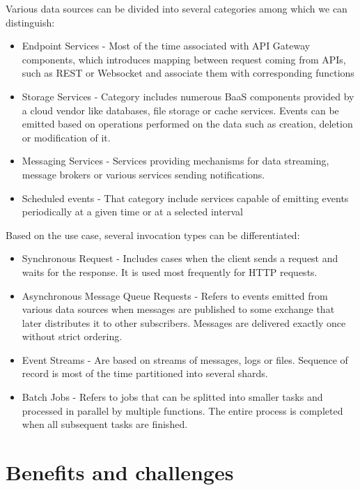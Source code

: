Various data sources can be divided into several categories among which we can distinguish:

\begin{itemize}
    \item Endpoint Services - Most of the time associated with API Gateway components, which introduces mapping between request coming from APIs, such as REST or Websocket and associate them with corresponding functions
    \item Storage Services - Category includes numerous BaaS components provided by a cloud vendor like databases, file storage or cache services. Events can be emitted based on operations performed on the data such as creation, deletion or modification of it.
    \item Messaging Services - Services providing mechanisms for data streaming, message brokers or various services sending notifications.
    \item Scheduled events - That category include services capable of emitting events periodically at a given time or at a selected interval
\end{itemize}

Based on the use case, several invocation types can be differentiated:

\begin{itemize}
    \item Synchronous Request - Includes cases when the client sends a request and waits for the response. It is used most frequently for HTTP requests.
    \item Asynchronous Message Queue Requests - Refers to events emitted from various data sources when messages are published to some exchange that later distributes it to other subscribers. Messages are delivered exactly once without strict ordering.
    \item Event Streams - Are based on streams of messages, logs or files. Sequence of record is most of the time partitioned into several shards.
    \item Batch Jobs - Refers to jobs that can be splitted into smaller tasks and processed in parallel by multiple functions. The entire process is completed when all subsequent tasks are finished.
\end{itemize}

\section{Benefits and challenges}

